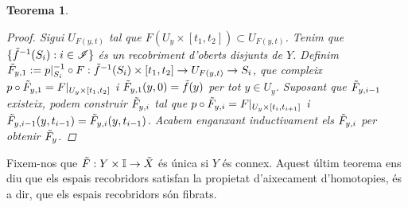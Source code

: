 \documentclass[compress,10pt]{article}
\newtheorem{teorema}{Teorema}[section]
\theoremstyle{definition}
\begin{document}
\begin{teorema}
\begin{proof}
        Sigui $U_{F(y,t)}$ tal que $F(U_{y}\times[t_{1},t_{2}])\subset U_{F(y,t)}$. Tenim que $\{\Tilde{f}^{-1}(S_{i}):i\in\mathscr{I}\}$ és un recobriment d'oberts disjunts de $Y$. Definim $\Tilde{F}_{y,1}:=p|_{S_{i}}^{-1}\circ F:\Tilde{f}^{-1}(S_{i})\times[t_{1},t_{2}]\rightarrow U_{F(y,t)}\rightarrow S_{i}$, que compleix $p\circ\Tilde{F}_{y,1}=F|_{U_{y}\times[t_{1},t_{2}]}$ i $\Tilde{F}_{y,1}(y,0)=\Tilde{f}(y)$ per tot $y\in U_{y}$. Suposant que $\Tilde{F}_{y,i-1}$ existeix, podem construir $\Tilde{F}_{y,i}$ tal que $p\circ\Tilde{F}_{y,i}=F|_{U_{y}\times[t_{i},t_{i+1}]}$ i $\Tilde{F}_{y,i-1}(y,t_{i-1})=\Tilde{F}_{y,i}(y,t_{i-1})$. Acabem enganxant inductivament els $\Tilde{F}_{y,i}$ per obtenir $\Tilde{F}_{y}$.
    \end{proof}
\end{teorema}
Fixem-nos que $\Tilde{F}:Y\times\mathbb{I}\rightarrow\Tilde{X}$ és única si $Y$ és connex. Aquest últim teorema ens diu que els espais recobridors satisfan la propietat d'aixecament d'homotopies, és a dir, que els espais recobridors són fibrats.
\end{document}

